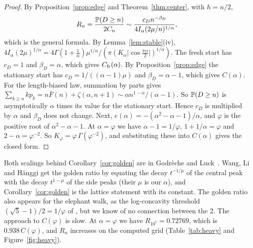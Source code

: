 \begin{proof}
By Proposition~\ref{prop:edge} and Theorem~\ref{thm:center}, with $h=n/2$,
\[
 R_n=\frac{\mathbb{P}(D\ge n)}{2C_n}\sim\frac{c_Dn^{-\beta_D}}{4I_\alpha
 (2\mu/n)^{1/\alpha}},
\]
which is the general formula. By Lemma~\ref{lem:stable}(iv),
$4I_\alpha(2\mu)^{1/\alpha}=4\Gamma(1+\frac1\alpha)\mu^{1/\alpha}/(\pi
(K_\alpha\lvert\cos\frac{\pi\alpha}2\rvert)^{1/\alpha})$. The fresh start has
$c_D=1$ and $\beta_D=\alpha$, which gives $C_{\rm fr}(\alpha)$. By
Proposition~\ref{prop:edge} the stationary start has
$c_D=1/((\alpha-1)\mu)$ and $\beta_D=\alpha-1$, which gives $C(\alpha)$. For
the length-biased law, summation by parts gives
$\sum_{k\ge n}kp_k=n\bar F(n)+\zeta(\alpha,n+1)\sim\alpha
n^{1-\alpha}/(\alpha-1)$. So $\mathbb{P}(D\ge n)$ is asymptotically $\alpha$ times
its value for the stationary start. Hence $c_D$ is multiplied by $\alpha$ and
$\beta_D$ does not change. Next, $e(\alpha)=-(\alpha^2-\alpha-1)/\alpha$, and
$\varphi$ is the positive root of $\alpha^2-\alpha-1$. At $\alpha=\varphi$ we
have $\alpha-1=1/\varphi$, $1+1/\alpha=\varphi$ and $2-\alpha=\varphi^{-2}$.
So $K_\varphi=\varphi\,\Gamma(\varphi^{-2})$, and substituting these into
$C(\alpha)$ gives the closed form.
\end{proof}

Both scalings behind Corollary~\ref{cor:golden} are in Godr\`eche and
Luck~\cite{godrecheluck2001}. Wang, Li and H\"anggi
\cite[Section~2.1]{wlh2016} get the golden ratio by equating the decay
$t^{-1/\mu}$ of the central peak with the decay $t^{1-\mu}$ of the side
peaks (their $\mu$ is our $\alpha$), and Corollary~\ref{cor:golden} is the
lattice statement with its constant. The
golden ratio also appears for the elephant walk, as the log-concavity
threshold $(\sqrt5-1)/2=1/\varphi$ of \cite[Proposition~2.2]{glrs2025}, but
we know of no connection between the 2. The approach to $C(\varphi)$ is
slow. At $\alpha=\varphi$ we have $R_{10^5}=0.72769$, which is
$0.938\,C(\varphi)$, and $R_n$ increases on the computed grid
(Table~\ref{tab:heavy} and Figure~\ref{fig:heavy}).

